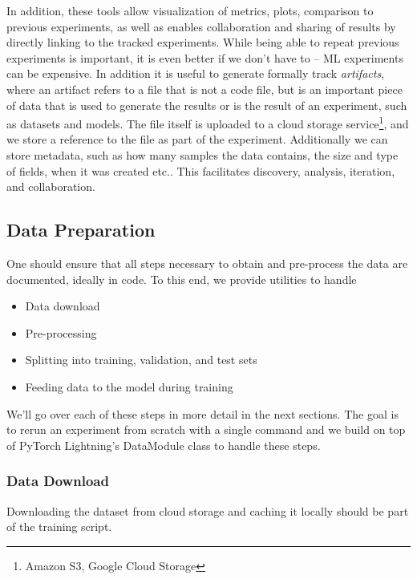 In addition, these tools allow visualization of metrics, plots, comparison to previous experiments, as well as enables collaboration and sharing of results by directly linking to the tracked experiments.
While being able to repeat previous experiments is important, it is even better if we don't have to -- ML experiments can be expensive.
In addition it is useful to generate formally track \textit{artifacts}, where an artifact refers to a file that is not a code file, but is an important piece of data that is used to generate the results or is the result of an experiment, such as datasets and models.
The file itself is uploaded to a cloud storage service\footnote{Amazon S3, Google Cloud Storage}, and we store a reference to the file as part of the experiment.
Additionally we can store metadata, such as how many samples the data contains, the size and type of fields, when it was created etc..
This facilitates discovery, analysis, iteration, and collaboration.


\subsection{Data Preparation}
One should ensure that all steps necessary to obtain and pre-process the data are documented, ideally in code.
To this end, we provide utilities to handle
\begin{itemize}
    \item Data download
    \item Pre-processing
    \item Splitting into training, validation, and test sets
    \item Feeding data to the model during training
\end{itemize}

We'll go over each of these steps in more detail in the next sections.
The goal is to rerun an experiment from scratch with a single command and we build on top of PyTorch Lightning's DataModule class to handle these steps.
\subsubsection{Data Download}
Downloading the dataset from cloud storage and caching it locally should be part of the training script.

